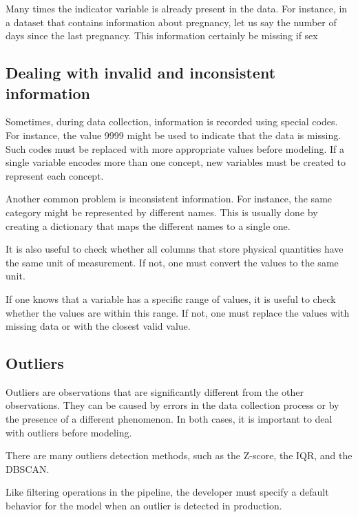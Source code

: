 Many times the indicator variable is already present in the data.  For instance, in a
dataset that contains information about pregnancy, let us say the number of days since
the last pregnancy.  This information certainly be missing if sex


\subsection{Dealing with invalid and inconsistent information}

Sometimes, during data collection, information is recorded using special codes.  For
instance, the value 9999 might be used to indicate that the data is missing.  Such codes
must be replaced with more appropriate values before modeling.  If a single variable
encodes more than one concept, new variables must be created to represent each concept.

Another common problem is inconsistent information.  For instance, the same category might
be represented by different names.  This is usually done by creating a dictionary that
maps the different names to a single one.

It is also useful to check whether all columns that store physical quantities have the
same unit of measurement.  If not, one must convert the values to the same unit.

If one knows that a variable has a specific range of values, it is useful to check
whether the values are within this range.  If not, one must replace the values with
missing data or with the closest valid value.

\subsection{Outliers}

Outliers are observations that are significantly different from the other observations.
They can be caused by errors in the data collection process or by the presence of a
different phenomenon.  In both cases, it is important to deal with outliers before
modeling.

There are many outliers detection methods, such as the Z-score, the IQR, and the DBSCAN.

Like filtering operations in the pipeline, the developer must specify a default behavior
for the model when an outlier is detected in production.

